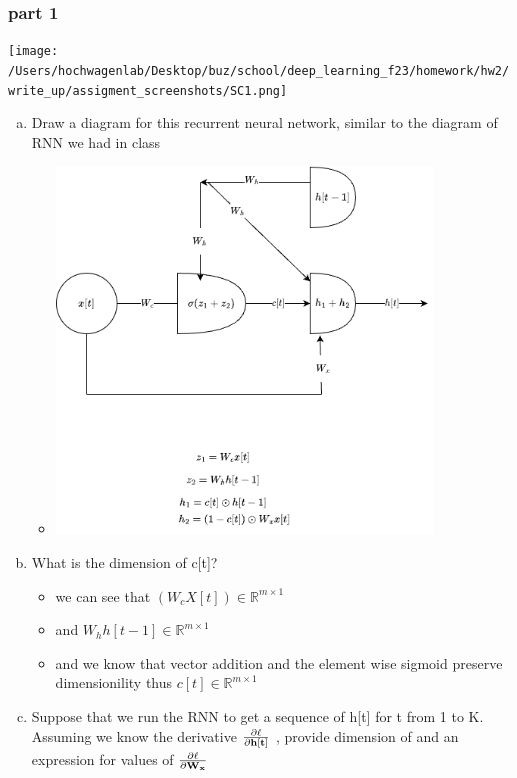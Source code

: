 \documentclass{article}
\begin{document}
\subsubsection{part 1 }
\texttt{[image: /Users/hochwagenlab/Desktop/buz/school/deep\_learning\_f23/homework/hw2/write\_up/assigment\_screenshots/SC1.png]}
\begin{enumerate}[(a)]%
    \item Draw a diagram for this recurrent neural network, similar to the
    diagram of RNN we had in class
    \begin{itemize}
        \color{blue}
        \item \includegraphics*[width=10cm]{./assigment_screenshots/rnn_1.png}
    \end{itemize}
    \item What is the dimension of c[t]?
    \begin{itemize}
        \color{blue}
        \item we can see that $(W_cX[t])\in \mathbb{R}^{m\times 1}$
        \item and $W_hh[t-1]\in \mathbb{R}^{m \times 1}$
        \item and we know that vector addition and  the element wise sigmoid preserve dimensionility thus $c[t]\in \mathbb{R}^{m\times 1}$
    \end{itemize}
    \item  Suppose that we run the RNN to get a sequence of h[t] for t from 1
    to K. Assuming we know the derivative $\frac{\partial \ell}{\partial \bold{h[t]}}$
    , provide dimension of and an
    expression for values of $\frac{\partial \ell}{\partial \bold{W_x}}$

\end{enumerate}
\end{document}
